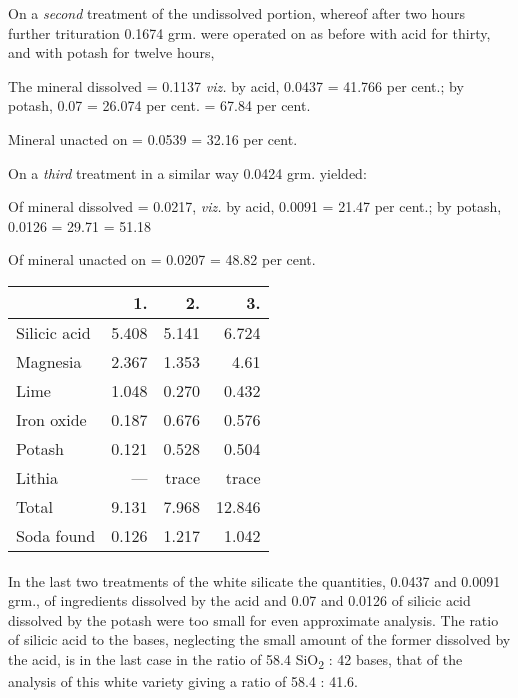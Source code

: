 \documentclass[a4paper, 12pt, oneside]{article}
\begin{document}
On a \emph{second} treatment of the undissolved portion, whereof after two hours further trituration 0.1674 grm. were operated on as before with acid for thirty, and with potash for twelve hours,

\bigskip

The mineral dissolved = 0.1137 \emph{viz.} {by acid, 0.0437 = 41.766 per cent.; by potash, 0.07 = 26.074 per cent.} = 67.84 per cent.

Mineral unacted on = 0.0539 = 32.16 per cent.

\bigskip

On a \emph{third} treatment in a similar way 0.0424 grm. yielded:

\bigskip

Of mineral dissolved = 0.0217, \emph{viz.} {by acid, 0.0091 = 21.47 per cent.; by potash, 0.0126 = 29.71} = 51.18

Of mineral unacted on = 0.0207 = 48.82 per cent.

\bigskip

\begin{table}[H]
    \centering
    \footnotesize
    \begin{tabular}{l r r r}
        ~ & 1. & 2. & 3. \\ \hline
        Silicic acid & 5.408 & 5.141 & 6.724 \\
        Magnesia & 2.367 & 1.353 & 4.61 \\
        Lime & 1.048 & 0.270 & 0.432 \\
        Iron oxide & 0.187 & 0.676 & 0.576 \\
        Potash & 0.121 & 0.528 & 0.504 \\
        Lithia & --- & trace & trace \\ \hline
        Total & 9.131 & 7.968 & 12.846 \\ \hline
        Soda found & 0.126 & 1.217 & 1.042 \\
    \end{tabular}
\end{table}
\paragraph{}
In the last two treatments of the white silicate the quantities, 0.0437 and 0.0091 grm., of ingredients dissolved by the acid and 0.07 and 0.0126 of silicic acid dissolved by the potash were too small for even approximate analysis. The ratio of silicic acid to the bases, neglecting the small amount of the former dissolved by the acid, is in the last case in the ratio of 58.4 SiO\textsubscript{2} : 42 bases, that of the analysis of this white variety giving a ratio of 58.4 : 41.6.
\end{document}
